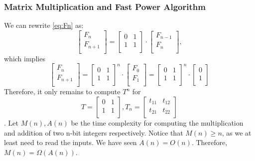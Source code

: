 \subsubsection{Matrix Multiplication and Fast Power Algorithm}
We can rewrite \eqref{eq:Fn} as:
\[
\begin{bmatrix}    
F_{n}\\
F_{n+1}\\
\end{bmatrix}
=
\begin{bmatrix}
    0 & 1\\
    1 & 1\\
\end{bmatrix}
\cdot
\begin{bmatrix}
    F_{n-1}\\
    F_{n}\\
\end{bmatrix},
\]
which implies
\[
\begin{bmatrix}    
F_{n}\\
F_{n+1}\\
\end{bmatrix}
=
\begin{bmatrix}
    0 & 1\\
    1 & 1\\
\end{bmatrix}^{n}
\cdot
\begin{bmatrix}
F_{0}\\
F_{1}\\
\end{bmatrix}
=
\begin{bmatrix}
    0 & 1\\
    1 & 1\\
\end{bmatrix}^{n}
\cdot
\begin{bmatrix}
0\\
1\\
\end{bmatrix}
\]
Therefore, it only remains to compute $T^n$ for 
\[T=\begin{bmatrix}
    0 & 1\\
    1 & 1\\
\end{bmatrix},
T_n=\begin{bmatrix}
    t_{11} & t_{12}\\
    t_{21} & t_{22}\\
\end{bmatrix}
\].
Let $M(n),A(n)$ be the time complexity for computing the multiplication and addition of two n-bit integers respectively. Notice that $M(n) \geq n$, as we at least need to read the inputs.
We have seen $A(n)=O(n)$. Therefore, $M(n)=\Omega(A(n))$.

